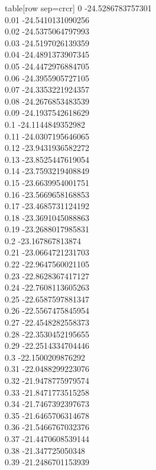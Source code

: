   table[row sep=crcr]{%
0	-24.5286783757301\\
0.01	-24.5410131090256\\
0.02	-24.5375064797993\\
0.03	-24.5197026139359\\
0.04	-24.4891373907345\\
0.05	-24.4472976884705\\
0.06	-24.3955905727105\\
0.07	-24.3353221924357\\
0.08	-24.2676853483539\\
0.09	-24.1937542618629\\
0.1	-24.1144849352982\\
0.11	-24.0307195646065\\
0.12	-23.9431936582272\\
0.13	-23.8525447619054\\
0.14	-23.7593219408849\\
0.15	-23.6639954001751\\
0.16	-23.5669658168853\\
0.17	-23.4685731124192\\
0.18	-23.3691045088863\\
0.19	-23.2688017985831\\
0.2	-23.167867813874\\
0.21	-23.0664721231703\\
0.22	-22.9647560021105\\
0.23	-22.8628367417127\\
0.24	-22.7608113605263\\
0.25	-22.6587597881347\\
0.26	-22.5567475845954\\
0.27	-22.4548282558373\\
0.28	-22.3530452195655\\
0.29	-22.2514334704446\\
0.3	-22.1500209876292\\
0.31	-22.0488299223076\\
0.32	-21.9478775979574\\
0.33	-21.8471773515258\\
0.34	-21.7467392397673\\
0.35	-21.6465706314678\\
0.36	-21.5466767032376\\
0.37	-21.4470608539144\\
0.38	-21.347725050348\\
0.39	-21.2486701153939\\
}
